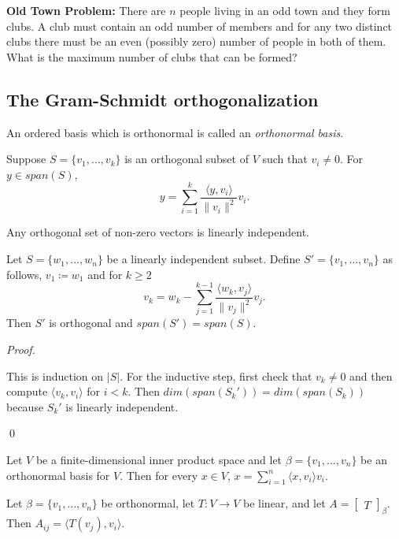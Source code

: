 \documentclass[12pt]{article}
\newenvironment{theorem}[2][Theorem]{\begin{trivlist}
\item[\hskip \labelsep {\bfseries #1}\hskip \labelsep {\bfseries #2.}]}{\end{trivlist}}
\newenvironment{corollary}[2][Corollary]{\begin{trivlist}
\item[\hskip \labelsep {\bfseries #1}\hskip \labelsep {\bfseries #2}]}{\end{trivlist}}
\newenvironment{definition}[2][Definition]{\begin{trivlist}
\item[\hskip \labelsep {\bfseries #1}\hskip \labelsep {\bfseries #2}]}{\end{trivlist}}
\newenvironment{sol}
    {\emph{Proof.}
    }
    {
    \qed
    }
\begin{document}
\textbf{Old Town Problem:} There are $n$ people living in an odd town and they form clubs. A club must contain an odd number of members and for any two distinct clubs there must be an even (possibly zero) number of people in both of them. What is the maximum number of clubs that can be formed?

\subsection{The Gram-Schmidt orthogonalization}

\begin{definition}{5}
An ordered basis which is orthonormal is called an \textit{orthonormal basis}.
\end{definition}

\begin{theorem}{6.3}
Suppose $S = \{v_1, \dots, v_k\}$ is an orthogonal subset of $V$ such that $v_i \neq 0$. For $y \in span(S)$, $$y = \sum_{i = 1}^k\frac{\langle y, v_i \rangle}{\lVert v_i \rVert^2}v_i.$$
\end{theorem}

\begin{corollary}{4}
Any orthogonal set of non-zero vectors is linearly independent.
\end{corollary}

\begin{theorem}{6.4 (Graham-Schmidt algorithm)} Let $S = \{w_1, \dots, w_n\}$ be a linearly independent subset. Define $S' = \{v_1, \dots, v_n\}$ as follows, $v_1 \coloneqq w_1$ and for $k \geq 2$ $$v_k = w_k - \sum_{j = 1}^{k-1}\frac{\langle w_k, v_j \rangle}{\lVert v_j \rVert^2}v_j.$$ Then $S'$ is orthogonal and $span(S') = span(S)$.
\end{theorem}

\begin{sol}
This is induction on $\lvert S \rvert$. For the inductive step, first check that $v_k \neq 0$ and then compute $\langle v_k, v_i \rangle$ for $i < k$. Then $dim(span(S_k')) = dim(span(S_k))$ because $S_k'$ is linearly independent. 
\end{sol}

\begin{theorem}{6.5}
Let $V$ be a finite-dimensional inner product space and let $\beta = \{v_1, \dots, v_n\}$ be an orthonormal basis for $V$. Then for every $x \in V$, $x = \sum_{i = 1}^n \langle x, v_i \rangle v_i$.
\end{theorem}

\begin{corollary}{7}
Let $\beta = \{v_1, \dots, v_n\}$ be orthonormal, let $T : V \to V$ be linear, and let $A = \begin{bmatrix}
T
\end{bmatrix}_\beta$. Then $A_{ij} = \langle T(v_j), v_i \rangle$. 
\end{corollary}
\end{document}
